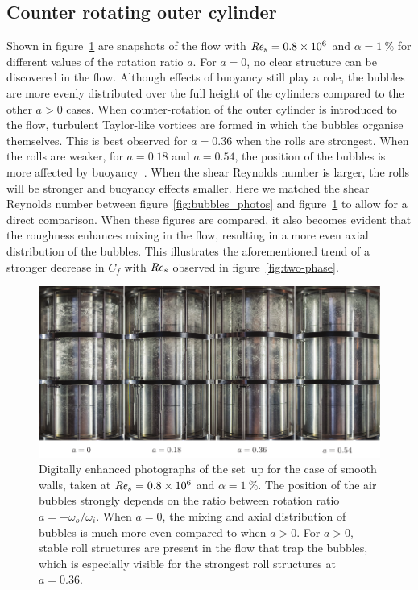 \documentclass[aps,twocolumn,10pt,floatfix, superscriptaddress,longbibliography,pra]{revtex4-1}
\newcommand\Rey{\mbox{\textit{Re$_s$}}}  %
\newcommand{\perc}[1]{ \SI{#1}{\percent} }
\newcommand{\e}[1]{\times 10^{#1}}
\begin{document}
\subsection{Counter rotating outer cylinder}
Shown in figure~\ref{fig:bubbles_photos_different_a} are snapshots of the flow with $\Rey = 0.8\e{6}$ and $\alpha = \perc{1}$ for different values of the rotation ratio $a$. For $a = 0$, no clear structure can be discovered in the flow. Although effects of buoyancy still play a role, the bubbles are more evenly distributed over the full height of the cylinders compared to the other $a > 0$ cases. When counter-rotation of the outer cylinder is introduced to the flow, turbulent Taylor-like vortices are formed in which the bubbles organise themselves. This is best observed for $a = 0.36$ when the rolls are strongest. When the rolls are weaker, for $a = 0.18$ and $a = 0.54$, the position of the bubbles is more affected by buoyancy~\citep{Spandan2018}. When the shear Reynolds number is larger, the rolls will be stronger and buoyancy effects smaller. Here we matched the shear Reynolds number between figure~\ref{fig:bubbles_photos} and figure~\ref{fig:bubbles_photos_different_a} to allow for a direct comparison. When these figures are compared, it also becomes evident that the roughness enhances mixing in the flow, resulting in a more even axial distribution of the bubbles. This illustrates the aforementioned trend of a stronger decrease in $C_f$ with $\Rey$ observed in figure~\ref{fig:two-phase}.
\begin{figure}
  \includegraphics[scale=1.1]{./figures/fig7_bubbles_photos}
  \caption{Digitally enhanced photographs of the set~up for the case of smooth walls, taken at $\Rey = 0.8\e{6}$ and $\alpha = \perc{1} $. The position of the air bubbles strongly depends on the ratio between rotation ratio $a = -\omega_o / \omega_i$. When $a = 0$, the mixing and axial distribution of bubbles is much more even compared to when $a > 0$. For $a>0$, stable roll structures are present in the flow that trap the bubbles, which is especially visible for the strongest roll structures at $a=0.36$.} \label{fig:bubbles_photos_different_a}
\end{figure}
\end{document}
